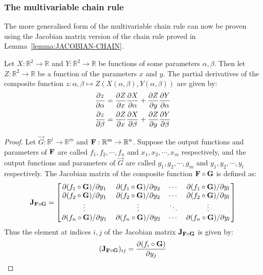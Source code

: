 \subsubsection{The multivariable chain rule}\label{section:MVCR}
The more generalised form of the multivariable chain rule can now be proven using the Jacobian matrix version of the chain rule proved in Lemma~\ref{lemma:JACOBIAN-CHAIN}.
\begin{lemma}\label{lemma:CHAIN}
    Let $X:\mathbb{R}^2\rightarrow\mathbb{R}$ and $Y:\mathbb{R}^2\rightarrow\mathbb{R}$ be functions of some parameters $\alpha,\beta$. Then let $Z:\mathbb{R}^2\rightarrow\mathbb{R}$
    be a function of the parameters $x$ and $y$. The partial derivatives of the composite function $z:\alpha,\beta\mapsto Z(X(\alpha,\beta),Y(\alpha,\beta))$ are given by:
    \begin{align*}
        \pdv{z}{\alpha}&=\pdv{Z}{x}\pdv{X}{\alpha}+\pdv{Z}{y}\pdv{Y}{\alpha}\\
        \pdv{z}{\beta}&=\pdv{Z}{x}\pdv{X}{\beta}+\pdv{Z}{y}\pdv{Y}{\beta}
    \end{align*}
    \begin{proof}
        Let $\vec{G}:\mathbb{R}^l\rightarrow\mathbb{R}^m$ and $\mathbf{F}:\mathbb{R}^m\rightarrow\mathbb{R}^n$. Suppose the output functions and parameters of $\mathbf{F}$ are called $f_1,f_2,\cdots,f_n$
        and $x_1,x_2,\cdots,x_m$ respectively, and the output functions and parameters of $\vec{G}$ are called $g_1,g_2,\cdots,g_m$ and $y_1,y_2,\cdots,y_l$ respectively. The Jacobian matrix of
        the composite function $\mathbf{F}\circ\mathbf{G}$ is defined as:
        $$
            \mathbf{J}_{\mathbf{F}\circ\mathbf{G}}=\begin{bmatrix}
                \pdv*{(f_1\circ\mathbf{G})}{y_1} & \pdv*{(f_1\circ\mathbf{G})}{y_2} & \cdots & \pdv*{(f_1\circ\mathbf{G})}{y_l}\\
                \pdv*{(f_2\circ\mathbf{G})}{y_1} & \pdv*{(f_2\circ\mathbf{G})}{y_2} & \cdots & \pdv*{(f_2\circ\mathbf{G})}{y_l}\\
                \vdots & \vdots & \ddots & \vdots \\
                \pdv*{(f_n\circ\mathbf{G})}{y_1} & \pdv*{(f_n\circ\mathbf{G})}{y_2} & \cdots & \pdv*{(f_n\circ\mathbf{G})}{y_l}\\
            \end{bmatrix}
        $$
        Thus the element at indices $i,j$ of the Jacobian matrix $\mathbf{J}_{\mathbf{F}\circ\mathbf{G}}$ is given by:
        $$
            (\mathbf{J}_{\mathbf{F}\circ\mathbf{G}})_{ij}=\pdv{(f_i\circ\mathbf{G})}{y_j}\\
$$
\end{proof}
\end{lemma}
